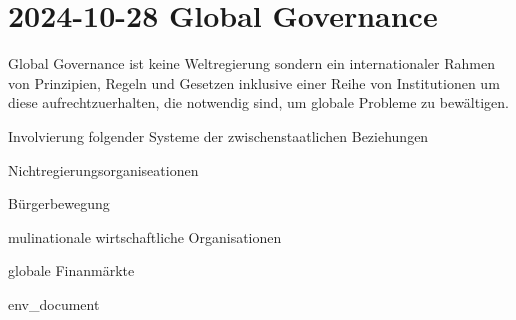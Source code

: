 \section{2024-10-28 Global Governance}


Global Governance ist keine Weltregierung sondern ein internationaler Rahmen von Prinzipien, Regeln und Gesetzen inklusive einer Reihe von Institutionen um diese aufrechtzuerhalten, die notwendig sind, um globale Probleme zu bewältigen.
\stopmyquote


\startitemize[packed]
\item Involvierung folgender Systeme der zwischenstaatlichen Beziehungen
\startitemize[packed]
\item Nichtregierungsorganiseationen
\item Bürgerbewegung
\item mulinationale wirtschaftliche Organisationen
\item globale Finanmärkte
\stopitemize
\stopitemize


\environment env_document

\usemodule[chart]
\startTEXpage
\setupFLOWcharts
[nx=3,
ny=3,
dx=2\bodyfontsize,
dy=2\bodyfontsize,
maxwidth=\textwidth
]

\setupFLOWshapes
[framecolor=black,
background=color,
backgroundcolor=white,
]

\startFLOWchart[DSP]

	\startFLOWcell
	\stopFLOWcell

	\startFLOWcell
	\stopFLOWcell

	\startFLOWcell
	\stopFLOWcell

	\startFLOWcell
	\stopFLOWcell



\stopFLOWchart

\FLOWchart[DSP]

\stopTEXpage
\stopbuffer

\startframedtext[width=\dimexpr\textwidth+\rightmarginwidth+\rightmargindistance\relax,frame=off,offset=none] %


\stopframedtext
